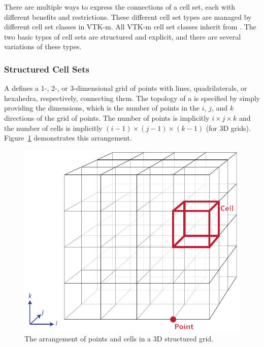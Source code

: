 There are multiple ways to express the connections of a cell set, each with
different benefits and restrictions. These different cell set types are
managed by different cell set classes in VTK-m. All VTK-m cell set classes
inherit from . The two basic types of cell sets are
structured and explicit, and there are several variations of these types.

\subsubsection{Structured Cell Sets}


A  defines a 1-, 2-, or 3-dimensional grid of
points with lines, quadrilaterals, or hexahedra, respectively, connecting
them. The topology of a  is specified by
simply providing the dimensions, which is the number of points in the $i$,
$j$, and $k$ directions of the grid of points. The number of points is
implicitly $i \times j \times k$ and the number of cells is implicitly
$(i-1) \times (j-1) \times (k-1)$ (for 3D grids).
Figure~\ref{fig:CellSetStructured} demonstrates this arrangement.

\begin{figure}
  \centering
  \includegraphics{images/StructuredCellSet}
  \caption{The arrangement of points and cells in a 3D structured grid.}
  \label{fig:CellSetStructured}
\end{figure}

